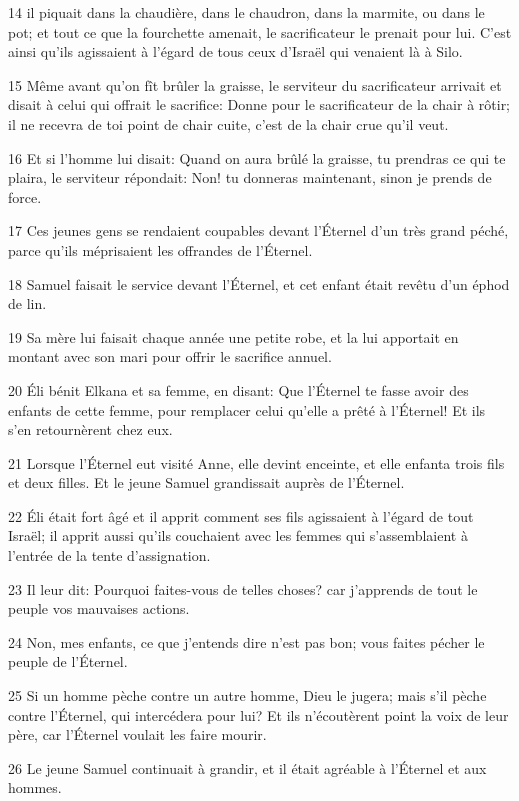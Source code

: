 \par 14 il piquait dans la chaudière, dans le chaudron, dans la marmite, ou dans le pot; et tout ce que la fourchette amenait, le sacrificateur le prenait pour lui. C'est ainsi qu'ils agissaient à l'égard de tous ceux d'Israël qui venaient là à Silo.
\par 15 Même avant qu'on fît brûler la graisse, le serviteur du sacrificateur arrivait et disait à celui qui offrait le sacrifice: Donne pour le sacrificateur de la chair à rôtir; il ne recevra de toi point de chair cuite, c'est de la chair crue qu'il veut.
\par 16 Et si l'homme lui disait: Quand on aura brûlé la graisse, tu prendras ce qui te plaira, le serviteur répondait: Non! tu donneras maintenant, sinon je prends de force.
\par 17 Ces jeunes gens se rendaient coupables devant l'Éternel d'un très grand péché, parce qu'ils méprisaient les offrandes de l'Éternel.
\par 18 Samuel faisait le service devant l'Éternel, et cet enfant était revêtu d'un éphod de lin.
\par 19 Sa mère lui faisait chaque année une petite robe, et la lui apportait en montant avec son mari pour offrir le sacrifice annuel.
\par 20 Éli bénit Elkana et sa femme, en disant: Que l'Éternel te fasse avoir des enfants de cette femme, pour remplacer celui qu'elle a prêté à l'Éternel! Et ils s'en retournèrent chez eux.
\par 21 Lorsque l'Éternel eut visité Anne, elle devint enceinte, et elle enfanta trois fils et deux filles. Et le jeune Samuel grandissait auprès de l'Éternel.
\par 22 Éli était fort âgé et il apprit comment ses fils agissaient à l'égard de tout Israël; il apprit aussi qu'ils couchaient avec les femmes qui s'assemblaient à l'entrée de la tente d'assignation.
\par 23 Il leur dit: Pourquoi faites-vous de telles choses? car j'apprends de tout le peuple vos mauvaises actions.
\par 24 Non, mes enfants, ce que j'entends dire n'est pas bon; vous faites pécher le peuple de l'Éternel.
\par 25 Si un homme pèche contre un autre homme, Dieu le jugera; mais s'il pèche contre l'Éternel, qui intercédera pour lui? Et ils n'écoutèrent point la voix de leur père, car l'Éternel voulait les faire mourir.
\par 26 Le jeune Samuel continuait à grandir, et il était agréable à l'Éternel et aux hommes.
